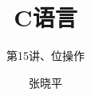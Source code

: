 \documentclass[11pt,notheorems]{beamer}
\begin{document}
\title{C语言}
\subtitle{第15讲、位操作}
\author{张晓平}


\begin{frame}[plain]\transboxout
\titlepage
\end{frame}

\begin{frame}[allowframebreaks]\transboxin
\begin{center}
\tableofcontents[hideallsubsections]
\end{center}
\end{frame}


                  
% 
%
% 
% 
% 
\end{document}

